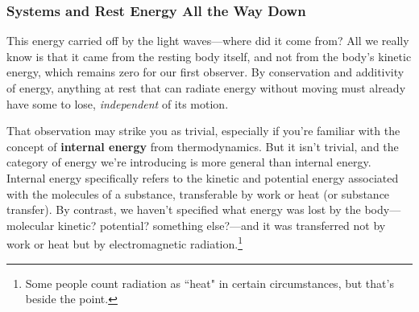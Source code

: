 \documentclass[12pt]{article}
\begin{document}
\subsubsection{Systems and Rest Energy All the Way Down}\label{sssec:sy}

This energy carried off by the light waves---where did it come from? All we really know is that it came from the resting body itself, and not from the body's kinetic energy, which remains zero for our first observer. By conservation and additivity of energy, anything at rest that can radiate energy without moving must already have some to lose, \emph{independent} of its motion.

That observation may strike you as trivial, especially if you're familiar with the concept of \textbf{internal energy} from thermodynamics. But it isn't trivial, and the category of energy we're introducing is more general than internal energy. Internal energy specifically refers to the kinetic and potential energy associated with the molecules of a substance, transferable by work or heat (or substance transfer). By contrast, we haven't specified what energy was lost by the body---molecular kinetic? potential? something else?---and it was transferred not by work or heat but by electromagnetic radiation.\footnote{Some people count radiation as ``heat" in certain circumstances, but that's beside the point.}
\end{document}
